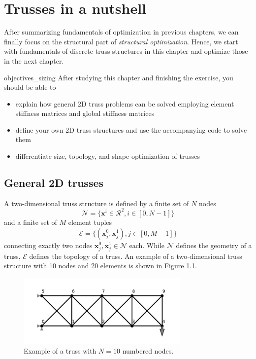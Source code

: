 \chapter{Trusses in a nutshell}
After summarizing fundamentals of optimization in previous chapters, we can finally focus on the structural part of \emph{structural optimization}. Hence, we start with fundamentals of discrete truss structures in this chapter and optimize those in the next chapter. 


\begin{objectives}{}{objectives_sizing}
After studying this chapter and finishing the exercise, you should be able to 
\begin{itemize}[label=$\dots$]
    \item explain how general 2D truss problems can be solved employing element stiffness matrices and global stiffness matrices
    \item define your own 2D truss structures and use the accompanying code to solve them
    \item differentiate size, topology, and shape optimization of trusses
\end{itemize}
\end{objectives}

\section{General 2D trusses}
A two-dimensional truss structure is defined by a finite set of $N$ nodes 
\begin{equation}
    \mathcal{N}=\{\mathbf{x}^i \in \mathcal{R}^2, i \in [0, N-1]\}
\end{equation} and a finite set of $M$ element tuples 
\begin{equation}
    \mathcal{E} = \{(\mathbf{x}^0_j, \mathbf{x}^1_j), j \in [0, M-1]\}
\end{equation} 
connecting exactly two nodes $\mathbf{x}^0_j,  \mathbf{x}^1_j \in \mathcal{N}$ each. While $\mathcal{N}$ defines the geometry of a truss, $\mathcal{E}$ defines the topology of a truss. An example of a two-dimensional truss structure with 10 nodes and 20 elements is shown in Figure \ref{fig:truss_example}.

\begin{figure}[!htpb]
    \centering
    \includegraphics[width=0.75\textwidth]{figures/truss_sample.pdf}
    \caption{Example of a truss with $N=10$ numbered nodes.}
    \label{fig:truss_example}
\end{figure}

